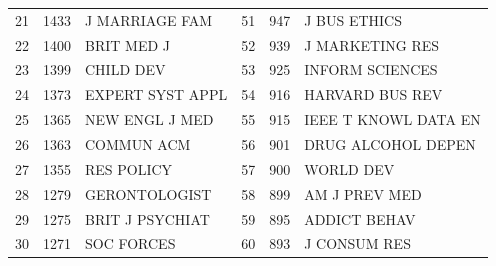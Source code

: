 \documentclass[hyperref={pdfstartview={FitBH -32768},
                         pdfpagemode=FullScreen,
                         plainpages=false,
                         colorlinks=true}
              ]{beamer}
\begin{document}
\begin{frame}[fragile]
\begin{tabular}{r|r|l||r|r|l}
21&   	1433&   	J MARRIAGE FAM&   	51&   	947&   	J BUS ETHICS\\   
22&   	1400&   	BRIT MED J&   	52&   	939&   	J MARKETING RES\\   
23&   	1399&   	CHILD DEV&   	53&   	925&   	INFORM SCIENCES\\   
24&   	1373&   	EXPERT SYST APPL&   	54&   	916&   	HARVARD BUS REV\\   
25&   	1365&   	NEW ENGL J MED&   	55&   	915&   	IEEE T KNOWL DATA EN\\   
26&   	1363&   	COMMUN ACM&   	56&   	901&   	DRUG ALCOHOL DEPEN\\   
27&   	1355&   	RES POLICY&   	57&   	900&   	WORLD DEV\\   
28&   	1279&   	GERONTOLOGIST&   	58&   	899&   	AM J PREV MED\\   
29&   	1275&   	BRIT J PSYCHIAT&   	59&   	895&   	ADDICT BEHAV\\   
30&   	1271&   	SOC FORCES&   	60&   	893&   	J CONSUM RES\\  \hline
\end{tabular}

\end{frame}
\end{document}
